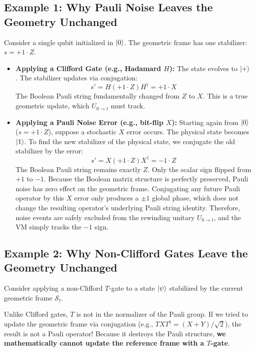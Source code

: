\documentclass[11pt]{article}
\begin{document}
\subsection{Example 1: Why Pauli Noise Leaves the Geometry Unchanged}

Consider a single qubit initialized in $\ket{0}$. The geometric frame has one stabilizer: $s = +1 \cdot Z$.

\begin{itemize}
    \item \textbf{Applying a Clifford Gate (e.g., Hadamard $H$):}
    The state evolves to $\ket{+}$. The stabilizer updates via conjugation:
    $$s' = H (+1 \cdot Z) H^\dagger = +1 \cdot X$$
    The Boolean Pauli string fundamentally changed from $Z$ to $X$. This is a true geometric update, which $U_{0 \to t}$ must track.

    \item \textbf{Applying a Pauli Noise Error (e.g., bit-flip $X$):}
    Starting again from $\ket{0}$ ($s = +1 \cdot Z$), suppose a stochastic $X$ error occurs. The physical state becomes $\ket{1}$. To find the new stabilizer of the physical state, we conjugate the old stabilizer by the error:
    $$s' = X (+1 \cdot Z) X^\dagger = -1 \cdot Z$$
    The Boolean Pauli string remains exactly $Z$. Only the scalar sign flipped from $+1$ to $-1$. Because the Boolean matrix structure is perfectly preserved, Pauli noise has zero effect on the geometric frame. Conjugating any future Pauli operator by this $X$ error only produces a $\pm 1$ global phase, which does not change the resulting operator's underlying Pauli string identity. Therefore, noise events are safely excluded from the rewinding unitary $U_{0 \to t}$, and the VM simply tracks the $-1$ sign.
\end{itemize}

\subsection{Example 2: Why Non-Clifford Gates Leave the Geometry Unchanged}

Consider applying a non-Clifford $T$-gate to a state $\ket{\psi}$ stabilized by the current geometric frame $\mathcal{S}_t$.

Unlike Clifford gates, $T$ is not in the normalizer of the Pauli group. If we tried to update the geometric frame via conjugation (e.g., $T X T^\dagger = (X+Y)/\sqrt{2}$), the result is not a Pauli operator! Because it destroys the Pauli structure, \textbf{we mathematically cannot update the reference frame with a $T$-gate}.
\end{document}
